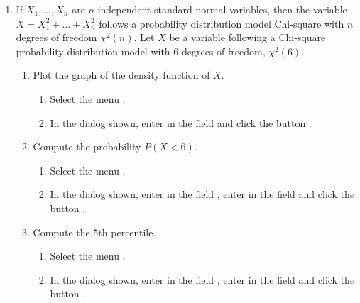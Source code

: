 \begin{enumerate}[leftmargin=*]
\item If $X_1,\ldots ,X_n$ are $n$ independent standard normal variables, then the variable $X=X_1^2 + \ldots + X_n^2$ follows a probability distribution model Chi-square with $n$ degrees of freedom $\chi^2(n)$. 
Let $X$ be a variable following a Chi-square probability distribution model with 6 degrees of freedom, $\chi^2(6)$. 
\begin{enumerate}
\item Plot the graph of the density function of $X$.
\begin{indication}
\begin{enumerate}
\item Select the menu .
\item In the dialog shown, enter  in the field  and click the button .
\end{enumerate}
\end{indication}


\item Compute the probability $P(X<6)$.
\begin{indication}
\begin{enumerate}
\item Select the menu .
\item In the dialog shown, enter  in the field , enter  in the field  and click the button .
\end{enumerate}
\end{indication}

\item Compute the 5th percentile.
\begin{indication}
\begin{enumerate}
\item Select the menu .
\item In the dialog shown, enter  in the field , enter  in the field  and click the button .
\end{enumerate}
\end{indication}


\end{enumerate}
\end{enumerate}
